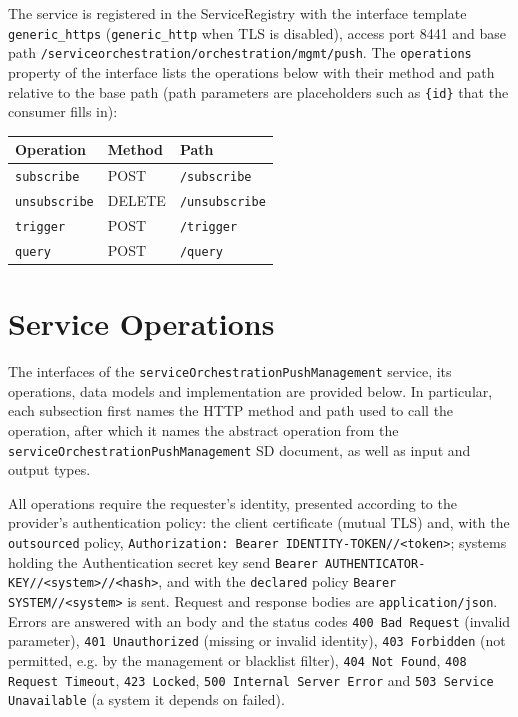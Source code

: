 \documentclass[a4paper]{arrowhead}
\newcommand{\mref}[2][]{{\textcolor{ArrowheadPurple}{\hyperref[sec:model:#2]{\ifstrempty{#1}{#2}{#1}}}}}
\begin{document}
The service is registered in the ServiceRegistry with the interface template \texttt{generic\_\allowbreak{}https} (\texttt{generic\_\allowbreak{}http} when TLS is disabled), access port 8441 and base path \texttt{/\allowbreak{}serviceorchestration/\allowbreak{}orchestration/\allowbreak{}mgmt/\allowbreak{}push}. The \texttt{operations} property of the interface lists the operations below with their method and path relative to the base path (path parameters are placeholders such as \texttt{\{id\}} that the consumer fills in):

\noindent\begin{longtable}{| p{5.2cm} | p{1.6cm} | p{8.4cm} |} \hline
\rowcolor{gray!33} Operation & Method & Path \\ \hline \endhead
\texttt{subscribe} & POST & \texttt{/\allowbreak{}subscribe} \\ \hline
\texttt{unsubscribe} & DELETE & \texttt{/\allowbreak{}unsubscribe} \\ \hline
\texttt{trigger} & POST & \texttt{/\allowbreak{}trigger} \\ \hline
\texttt{query} & POST & \texttt{/\allowbreak{}query} \\ \hline
\end{longtable}

\newpage

\section{Service Operations}
\label{sec:operations}

The interfaces of the \texttt{service\allowbreak{}Orchestration\allowbreak{}Push\allowbreak{}Management} service, its operations, data models and implementation are provided below.
In particular, each subsection first names the HTTP method and path used to call the operation, after which it names the abstract operation from the \texttt{service\allowbreak{}Orchestration\allowbreak{}Push\allowbreak{}Management} SD document, as well as input and output types.

All operations require the requester's identity, presented according to the provider's authentication policy: the client certificate (mutual TLS) and, with the \texttt{outsourced} policy, \texttt{Authorization: Bearer IDENTITY-TOKEN//<token>}; systems holding the Authentication secret key send \texttt{Bearer AUTHENTICATOR-KEY//<system>//<hash>}, and with the \texttt{declared} policy \texttt{Bearer SYSTEM//<system>} is sent. Request and response bodies are \texttt{application/json}.
Errors are answered with an \mref{ErrorMessage} body and the status codes \texttt{400 Bad Request} (invalid parameter), \texttt{401 Unauthorized} (missing or invalid identity), \texttt{403 Forbidden} (not permitted, e.g. by the management or blacklist filter), \texttt{404 Not Found}, \texttt{408 Request Timeout}, \texttt{423 Locked}, \texttt{500 Internal Server Error} and \texttt{503 Service Unavailable} (a system it depends on failed).
\end{document}
